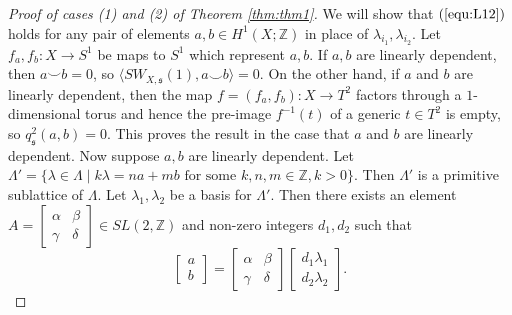 \documentclass{amsart}
\theoremstyle{definition}
\theoremstyle{remark}
\numberwithin{equation}{section}
\begin{document}
\begin{proof}[Proof of cases (1) and (2) of Theorem \ref{thm:thm1}]
We will show that $(\ref{equ:L12})$ holds for any pair of elements $a,b \in H^1(X ; \mathbb{Z})$ in place of $\lambda_{i_1}, \lambda_{i_2}$. Let $f_a,f_b : X \to S^1$ be maps to $S^1$ which represent $a,b$. If $a,b$ are linearly dependent, then $a \smallsmile b = 0$, so $\langle SW_{X,\mathfrak{s}}(1) , a \smallsmile b \rangle = 0$. On the other hand, if $a$ and $b$ are linearly dependent, then the map $f = (f_a , f_b) : X \to T^2$ factors through a $1$-dimensional torus and hence the pre-image $f^{-1}(t)$ of a generic $t \in T^2$ is empty, so $q_{\mathfrak{s}}^2( a , b ) = 0$. This proves the result in the case that $a$ and $b$ are linearly dependent. Now suppose $a,b$ are linearly dependent. Let $\Lambda' = \{ \lambda \in \Lambda \; | \; k\lambda = n a + m b \text{ for some } k,n,m \in \mathbb{Z}, k > 0 \}$. Then $\Lambda'$ is a primitive sublattice of $\Lambda$. Let $\lambda_1, \lambda_2$ be a basis for $\Lambda'$. Then there exists an element $A = \left[ \begin{matrix} \alpha & \beta \\ \gamma & \delta \end{matrix} \right] \in SL(2,\mathbb{Z})$ and non-zero integers $d_1,d_2$ such that
\begin{equation}\label{equ:abA}
\left[ \begin{matrix} a \\ b \end{matrix} \right] = \left[ \begin{matrix} \alpha & \beta \\ \gamma & \delta \end{matrix} \right] \left[ \begin{matrix} d_1 \lambda_1 \\ d_2 \lambda_2 \end{matrix} \right].
\end{equation}

\end{proof}
\end{document}
